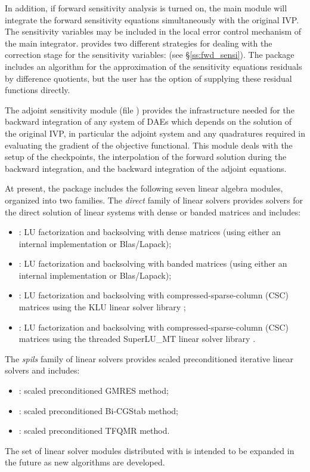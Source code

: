 In addition, if forward sensitivity analysis is turned on, the main module 
will integrate the forward sensitivity equations simultaneously with the original
IVP. The sensitivity variables may be included in the local error control
mechanism of the main integrator.
{\idas} provides two different strategies for dealing with the correction
stage for the sensitivity variables:  
(see \S\ref{ss:fwd_sensi}).
The {\idas} package includes an algorithm for the approximation of the
sensitivity equations residuals by difference quotients, but the user has
the option of supplying these residual functions directly.

The adjoint sensitivity module (file ) provides the infrastructure needed for the 
backward integration of any system of DAEs which depends on the solution 
of the original IVP, in particular the adjoint system and any quadratures required
in evaluating the gradient of the objective functional.  This module deals with
the setup of the checkpoints, the interpolation of the forward solution during
the backward integration, and the backward integration of the adjoint equations.

At present, the package includes the following seven {\idas} linear algebra
modules, organized into two families. The {\em direct} family of linear
solvers provides solvers for the direct solution of linear systems with
dense or banded matrices and includes:
\begin{itemize} 
\item {\idadense}: LU factorization and backsolving with dense matrices
  (using either an internal implementation or Blas/Lapack); 
\item {\idaband}: LU factorization and backsolving with banded matrices
  (using either an internal implementation or Blas/Lapack); 
\item {\idaklu}: LU factorization and backsolving with
  compressed-sparse-column (CSC) matrices using the KLU linear solver
  library \cite{KLU_site};
\item {\idasuperlumt}: LU factorization and backsolving with
  compressed-sparse-column (CSC) matrices using the threaded
  SuperLU\_MT linear solver library \cite{SuperLUMT_site}.
\end{itemize}
The {\em spils} family of linear solvers provides scaled preconditioned
iterative linear solvers and includes:
\begin{itemize} 
\item {\idaspgmr}: scaled preconditioned GMRES method;
\item {\idaspbcg}: scaled preconditioned Bi-CGStab method;
\item {\idasptfqmr}: scaled preconditioned TFQMR method.
\end{itemize}
The set of linear solver modules distributed with {\idas} is intended to be expanded in the
future as new algorithms are developed.

